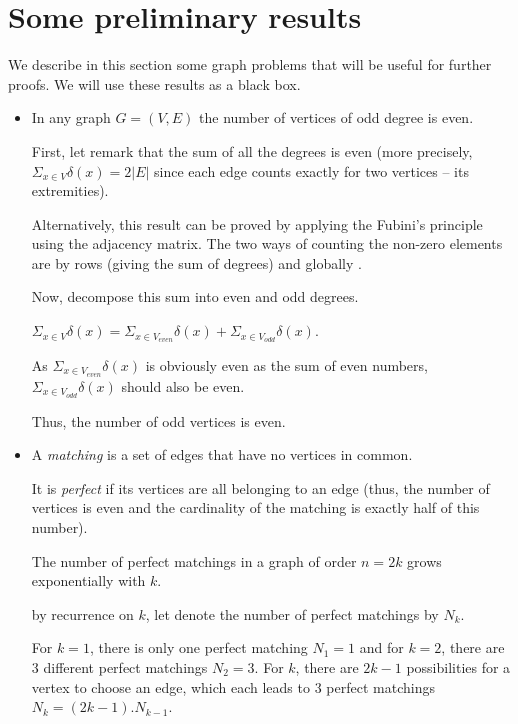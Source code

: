 \section{Some preliminary results}

We describe in this section some graph problems that will be useful for further proofs.
We will use these results as a black box. 

\begin{itemize}
\item
{} In any graph $G=(V,E)$ the number of vertices of odd degree is even.
\bigskip

First, let remark that the sum of all the degrees is even
(more precisely, $\Sigma_{x \in V} \delta(x) = 2 |E|$ since each edge counts exactly for two vertices -- its extremities). 

Alternatively, this result can be proved by applying the Fubini's principle using the adjacency matrix.
The two ways of counting the non-zero elements are by rows (giving the sum of degrees) and globally . 
\bigskip

Now, decompose this sum into even and odd degrees.

$\Sigma_{x \in V} \delta(x) = \Sigma_{x \in V_{even}} \delta(x) + \Sigma_{x \in V_{odd}} \delta(x)$.

As $\Sigma_{x \in V_{even}} \delta(x)$ is obviously even as the sum of even numbers, $\Sigma_{x \in V_{odd}} \delta(x)$ should also be even. 

Thus, the number of odd vertices is even.
\item
{}
A \textit{matching} is a set of edges that have no vertices in common.

It is \textit{perfect} if its vertices are all belonging to an edge (thus, the number of vertices is even 
and the cardinality of the matching is exactly half of this number).
\bigskip

The number of perfect matchings in a graph of order $n=2k$ grows exponentially with $k$.
\bigskip

by recurrence on $k$, let denote the number of perfect matchings by $N_k$.

For $k=1$, there is only one perfect matching 
$N_1=1$
and for $k=2$, there are $3$ different perfect matchings  
$N_2=3$.
For $k$, there are $2k-1$ possibilities for a vertex to choose an edge, which each leads to $3$ perfect matchings 
$N_k = (2k-1).N_{k-1}$. 


\end{itemize}
